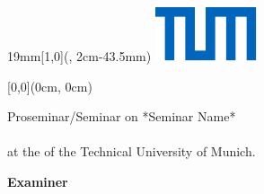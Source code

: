 
\newcommand{\SeitenrandOben}{43.5mm}
\newcommand{\SeitenrandRechts}{20mm}
\newcommand{\SeitenrandLinks}{20mm}
\newcommand{\SeitenrandUnten}{10mm}

\newcommand{\UniversitaetLogoBreite}{19mm}
\newcommand{\UniversitaetLogoHoehe}{1cm}

\usepackage[a4paper,
    top=\SeitenrandOben,
    bottom=\SeitenrandUnten,
    inner=\SeitenrandLinks,
    outer=\SeitenrandRechts,
    foot=0cm,
    head=0cm
]{geometry}

\textblockorigin{\SeitenrandLinks}{\SeitenrandOben} %

\setlength{\parindent}{0pt}
\setlength{\parskip}{\baselineskip}
\TabPositions{4cm}
\pagestyle{empty}






\begin{textblock*}{\UniversitaetLogoBreite}[1,0](\textwidth-1mm, 2cm-\SeitenrandOben)%
    \raggedleft\includegraphics{./Ressourcen/Universitaet_Logo_RGB.pdf}%
\end{textblock*}


\begin{textblock*}{\textwidth}[0,0](0cm, 0cm)%
{\fontsize{24pt}{26pt}\selectfont\textbf{\Titel}}

\vspace*{14pt}
{\fontsize{18pt}{27pt}\selectfont\textbf{\Untertitel}}
\end{textblock*}

\vspace*{92.2mm}
\fontsize{15pt}{17.5pt}\selectfont%
Proseminar/Seminar on *Seminar Name*
\\
\Grad\\
at the \Fakultaet{} of the Technical University of Munich.

\renewcommand{\baselinestretch}{1.47}
\normalsize\selectfont
\vspace*{17.1mm}
\textbf{Examiner}\tab
\begin{minipage}[t]{\textwidth-\CurrentLineWidth}
\BetreutVonPerson\\
\BetreutVonLehrstuhl\strut
\end{minipage}

